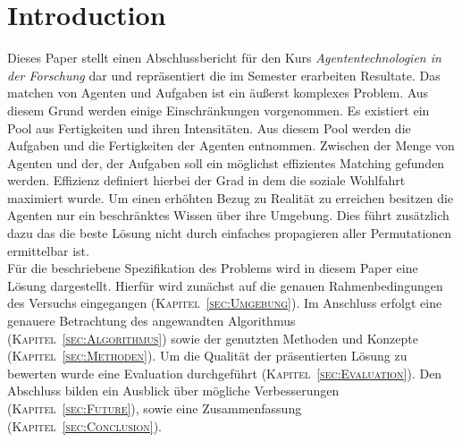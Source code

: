 \documentclass[fleqn,10pt]{SelfArx} %
\newcommand{\ChapterCite}[1]{\textsc{Kapitel~\ref{#1}}}
\begin{document}
\flushbottom %

\maketitle %

\tableofcontents %

\thispagestyle{empty} %


\section*{Introduction} %
\label{sec:introduction}


Dieses Paper stellt einen Abschlussbericht für den Kurs \textit{Agententechnologien in der Forschung} dar und repräsentiert die im Semester erarbeiten Resultate. Das matchen von Agenten und Aufgaben ist ein äußerst komplexes Problem. Aus diesem Grund werden einige Einschränkungen vorgenommen. Es existiert ein Pool aus Fertigkeiten und ihren Intensitäten. Aus diesem Pool werden die Aufgaben und die Fertigkeiten der Agenten entnommen. Zwischen der Menge von Agenten und der, der Aufgaben soll ein möglichst effizientes Matching gefunden werden. Effizienz definiert hierbei der Grad in dem die soziale Wohlfahrt maximiert wurde. Um einen erhöhten Bezug zu Realität zu erreichen besitzen die Agenten nur ein beschränktes Wissen über ihre Umgebung. Dies führt zusätzlich dazu das die beste Lösung nicht durch einfaches propagieren aller Permutationen ermittelbar ist. \\
Für die beschriebene Spezifikation des Problems wird in diesem Paper eine Lösung dargestellt. Hierfür wird zunächst auf die genauen Rahmenbedingungen des Versuchs eingegangen (\ChapterCite{sec:Umgebung}). Im Anschluss erfolgt eine genauere Betrachtung des angewandten Algorithmus (\ChapterCite{sec:Algorithmus}) sowie der genutzten Methoden und Konzepte (\ChapterCite{sec:Methoden}). Um die Qualität der präsentierten Lösung zu bewerten wurde eine Evaluation durchgeführt (\ChapterCite{sec:Evaluation}). Den Abschluss bilden ein Ausblick über mögliche Verbesserungen (\ChapterCite{sec:Future}), sowie eine Zusammenfassung (\ChapterCite{sec:Conclusion}). 
\end{document}
